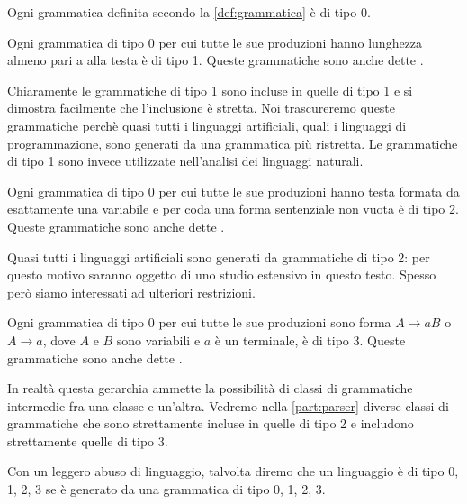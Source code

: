 \begin{definition}\label{def:tipo-0}
Ogni grammatica \gramm definita secondo la \cref{def:grammatica} è di tipo 0.
\end{definition}

\begin{definition}\label{def:tipo-1}
Ogni grammatica \gramm di tipo 0 per cui tutte le sue produzioni hanno lunghezza almeno pari a alla testa è di tipo 1.
Queste grammatiche sono anche dette .
\end{definition}

Chiaramente le grammatiche di tipo 1 sono incluse in quelle di tipo 1 e si dimostra facilmente che l'inclusione è stretta.
Noi trascureremo queste grammatiche perchè quasi tutti i linguaggi artificiali, quali i linguaggi di programmazione,
sono generati da una grammatica più ristretta.
Le grammatiche di tipo 1 sono invece utilizzate nell'analisi dei linguaggi naturali.


\begin{definition}\label{def:tipo-2}\label{def:CFG}
Ogni grammatica \gramm di tipo 0 per cui tutte le sue produzioni hanno testa formata da esattamente una variabile e per
coda una forma sentenziale non vuota è di tipo 2.
Queste grammatiche sono anche dette .
\end{definition}

Quasi tutti i linguaggi artificiali sono generati da grammatiche di tipo 2: per questo motivo saranno oggetto di uno
studio estensivo in questo testo.
Spesso però siamo interessati ad ulteriori restrizioni.

\begin{definition}\label{def:tipo-3}
Ogni grammatica \gramm di tipo 0 per cui tutte le sue produzioni sono forma $A\to aB$ o $A\to a$, dove $A$ e $B$ sono
variabili e $a$ è un terminale, è di tipo 3.
Queste grammatiche sono anche dette .
\end{definition}

In realtà questa gerarchia ammette la possibilità di classi di grammatiche intermedie fra una classe e un'altra.
Vedremo nella \cref{part:parser} diverse classi di grammatiche che sono strettamente incluse in quelle di tipo 2 e
includono strettamente quelle di tipo 3.

Con un leggero abuso di linguaggio, talvolta diremo che un linguaggio è di tipo 0, 1, 2, 3 se è generato da una
grammatica di tipo 0, 1, 2, 3.

